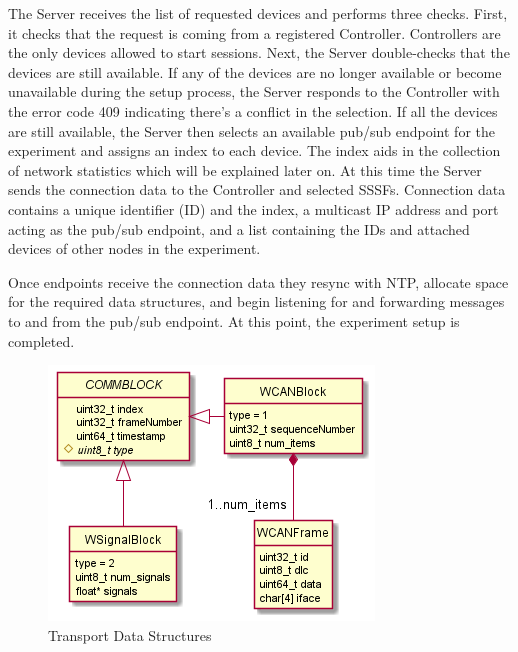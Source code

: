 \documentclass[letterpaper,twocolumn,12pt]{article}
\begin{document}
The Server receives the list of requested devices and performs three checks. First, it checks that the request is coming from a registered Controller. Controllers are the only devices allowed to start sessions. Next, the Server double-checks that the devices are still available. If any of the devices are no longer available or become unavailable during the setup process, the Server responds to the Controller with the error code 409 indicating there's a conflict in the selection. If all the devices are still available, the Server then selects an available pub/sub endpoint for the experiment and assigns an index to each device. The index aids in the collection of network statistics which will be explained later on. At this time the Server sends the connection data to the Controller and selected SSSFs. Connection data contains a unique identifier (ID) and 
the index, 
a multicast IP address and port acting as the pub/sub endpoint, and a list containing the IDs and attached devices of other nodes in the experiment.

Once endpoints receive the connection data they resync with NTP, allocate space for the required data structures, and begin listening for and forwarding messages to and from the pub/sub endpoint. At this point, the experiment setup is completed.

\begin{figure}[]
    \centering
    \includegraphics[width=\linewidth]{out/images/data_structures/data_structures.png}
    \caption{Transport Data Structures}
    \label{fig:ds}
\end{figure}
\end{document}
